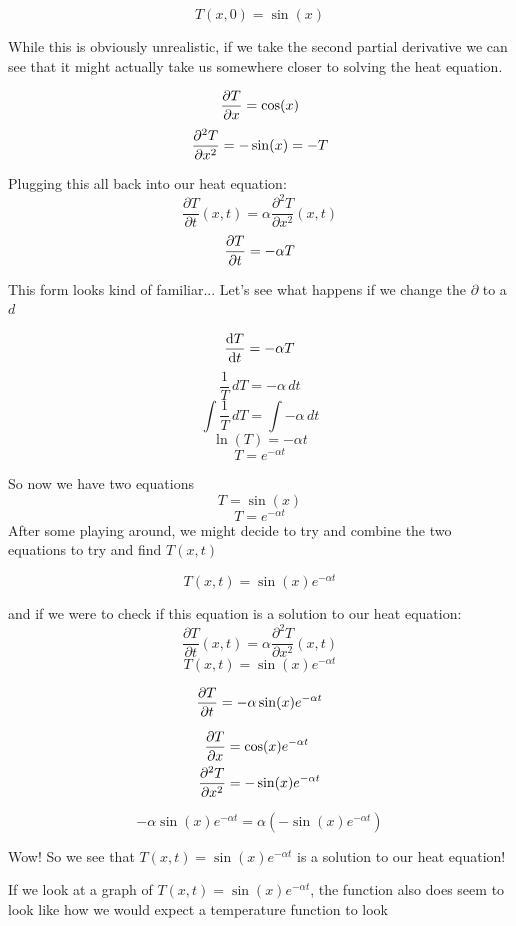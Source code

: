 \documentclass{report}
\newcommand{\heatequation}[0]{\frac{\partial T}{\partial t}(x,t) = \alpha \frac{\partial^2 T}{\partial x^2}(x,t)}
\begin{document}
$$T(x,0) = \sin(x)$$

While this is obviously unrealistic, if we take the second partial derivative we can see that it might actually
take us somewhere closer to solving the heat equation.

\[ \pdv{T}{x} = \cos(x)\]
\[ \pdv[2]{T}{x} = -\sin(x) = -T\]

Plugging this all back into our heat equation:
\[ \heatequation \]
\[ \pdv{T}{t} = -\alpha T \]

This form looks kind of familiar... Let's see what happens if we change the $\partial$ to a $d$

\[ \dv{T}{t} = -\alpha T\]
\[ \frac{1}{T} \, dT=-\alpha \, dt \]
\[ \int\frac{1}{T} \, dT=\int-\alpha \, dt \]
\[ \ln(T) = -\alpha t \]
\[ T = e^{-\alpha t} \]

So now we have two equations
\[ T = \sin(x) \]
\[ T = e^{-\alpha t} \]
After some playing around, we might decide to try and combine the two equations to try and find $T(x,t)$

\begin{equation} \label{solution_with_sin}
    T(x,t) = \sin(x)e^{-\alpha t} 
\end{equation}

and if we were to check if this equation is a solution to our heat equation:
\[ \heatequation \]
\[ T(x,t) = \sin(x)e^{-\alpha t} \]
\begin{minipage}{0.45\textwidth}
  \begin{align*}
      \pdv{T}{t} = -\alpha \sin(x)e^{-\alpha t}
    \end{align*}
\end{minipage}
\begin{minipage}{0.45\textwidth}
    \begin{align*}
        \pdv{T}{x} &= \cos(x)e^{-\alpha t} \\
        \pdv[2]{T}{x} &= -\sin(x)e^{-\alpha t} 
    \end{align*}
\end{minipage}

\[ -\alpha \sin(x)e^{-\alpha t} = \alpha (-\sin(x)e^{-\alpha t} ) \]

Wow! So we see that $T(x,t) = \sin(x)e^{-\alpha t}$ is a solution to our heat equation!

\pagebreak

If we look at a graph of $T(x,t) = \sin(x)e^{-\alpha t}$, the function also does seem to look like
how we would expect a temperature function to look
\end{document}
